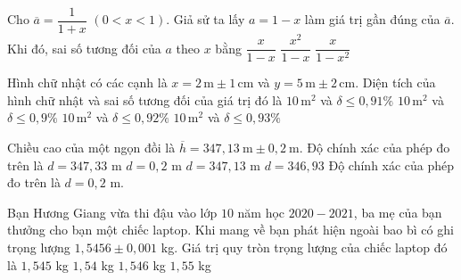 \begin{ex}%
	Cho $\overline{a} = \dfrac{1}{1+x}$ $(0 < x < 1)$. Giả sử ta lấy $a = 1- x$ làm giá trị gần đúng của $\overline{a}$. Khi đó, sai số tương đối của $a$ theo $x$ bằng
	{$\dfrac{x}{1-x}$}
	{$\dfrac{x^2}{1-x}$}
	{$\dfrac{x}{1-x^2}$}
\end{ex}

\begin{ex}%
	Hình chữ nhật có các cạnh là $x = 2 \mathrm{\, m} \pm 1 \mathrm{\, cm}$ và $y = 5 \mathrm{\, m} \pm 2 \mathrm{\, cm}$. Diện tích của hình chữ nhật và sai số tương đối của giá trị đó là
	\choice
	{$10 \mathrm{\, m}^2$ và $\delta \leq 0{,}91 \%$}
	{\True $10 \mathrm{\, m}^2$ và $\delta \leq 0{,}9 \%$}
	{$10 \mathrm{\, m}^2$ và $\delta \leq 0{,}92 \%$}
	{$10 \mathrm{\, m}^2$ và $\delta \leq 0{,}93 \%$}
\end{ex}


\begin{ex}%
Chiều cao của một ngọn đồi là $\overline{h}=347{,}13\ \mathrm{m}\pm 0{,}2\ \mathrm{m}$. Độ chính xác của phép đo trên là 
\choice
{$d=347{,}33$ m}
{\True $d=0{,}2$ m}
{$d=347{,}13$ m}
{$d=346{,}93$}
\loigiai
{Độ chính xác của phép đo trên là $d=0{,}2$ m.
}
\end{ex}

\begin{ex}%
	Bạn Hương Giang vừa thi đậu vào lớp $ 10 $ năm học $ 2020 - 2021 $, ba mẹ của bạn thưởng cho bạn một chiếc laptop. Khi mang về bạn phát hiện ngoài bao bì có ghi trọng lượng $ 1{,}5456\pm 0{,}001 $ kg. Giá trị quy tròn trọng lượng của chiếc laptop đó là
	\choice
	{$1{,}545$ kg}
	{$1{,}54 $ kg}
	{$ 1{,}546$ kg}
	{\True $ 1{,}55 $ kg}
\end{ex}

